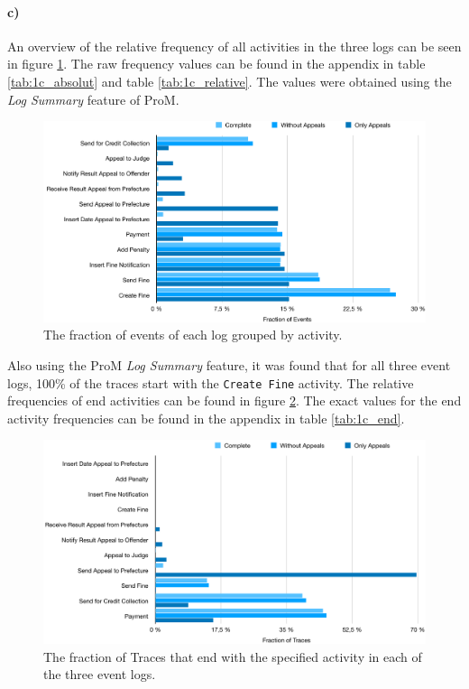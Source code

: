 \documentclass[12pt]{report}
\begin{document}
\paragraph{\textbf{c)}}

An overview of the relative frequency of all activities in the three logs can be seen in figure \ref{fig:activity_frequencies}. The raw frequency values can be found in the appendix in table \ref{tab:1c_absolut} and table \ref{tab:1c_relative}. The values were obtained using the \emph{Log Summary} feature of ProM. 
\begin{figure}[H]
  \centering
  \includegraphics[width=\textwidth]{figures/activity_frequencies.png}
  \caption{The fraction of events of each log grouped by activity.}
  \label{fig:activity_frequencies}
\end{figure}

Also using the ProM \emph{Log Summary} feature, it was found that for all three event logs, 100\% of the traces start with the \texttt{Create Fine} activity. The relative frequencies of end activities can be found in figure \ref{fig:end_frequencies}. The exact values for the end activity frequencies can be found in the appendix in table \ref{tab:1c_end}. 
\begin{figure}[H]
  \centering
  \includegraphics[width=\textwidth]{figures/end_frequencies.png}
  \caption{The fraction of Traces that end with the specified activity in each of the three event logs.}
  \label{fig:end_frequencies}
\end{figure}
\end{document}
